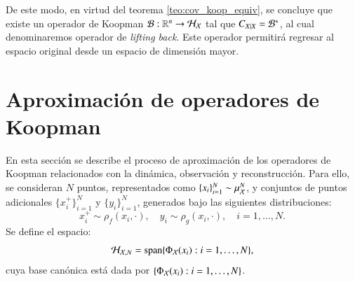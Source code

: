 De este modo, en virtud del teorema \ref{teo:cov_koop_equiv}, se concluye que existe un operador de Koopman $\mathcal{B} : \mathbb{R}^n \to \mathcal{H}_{\mathcal{X}}$ tal que $C_{X|X} = \mathcal{B}^*$, al cual denominaremos operador de \textit{lifting back}. Este operador permitirá regresar al espacio original desde un espacio de dimensión mayor.

\section{Aproximación de operadores de Koopman}

En esta sección se describe el proceso de aproximación de los operadores de Koopman relacionados con la dinámica, observación y reconstrucción. Para ello, se consideran \( N \) puntos, representados como \( \{ x_i \}_{i=1}^N \sim \mu_{\mathcal{X}}^N \), y conjuntos de puntos adicionales \( \{ x^+_i \}_{i=1}^N \) y \( \{ y_i \}_{i=1}^N \), generados bajo las siguientes distribuciones:
\begin{equation*}
    x^+_i \sim \rho_f (x_i, \cdot), \quad y_i \sim \rho_g (x_i, \cdot), \quad i = 1, \dots, N.
\end{equation*}
Se define el espacio:
\begin{equation*}
    \mathcal{H}_{\mathcal{X}, N} = \text{span} \{\Phi_{\mathcal{X}} (x_i) : i = 1, \dots, N \},
\end{equation*}
cuya base canónica está dada por \( \{\Phi_{\mathcal{X}} (x_i) : i = 1, \dots, N \} \).


